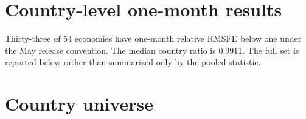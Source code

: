 \documentclass[12pt]{article}
\begin{document}
\section{Country-level one-month results}
Thirty-three of 54 economies have one-month relative RMSFE below one under the May release convention. The median country ratio is 0.9911. The full set is reported below rather than summarized only by the pooled statistic.


\section{Country universe}

\end{document}
